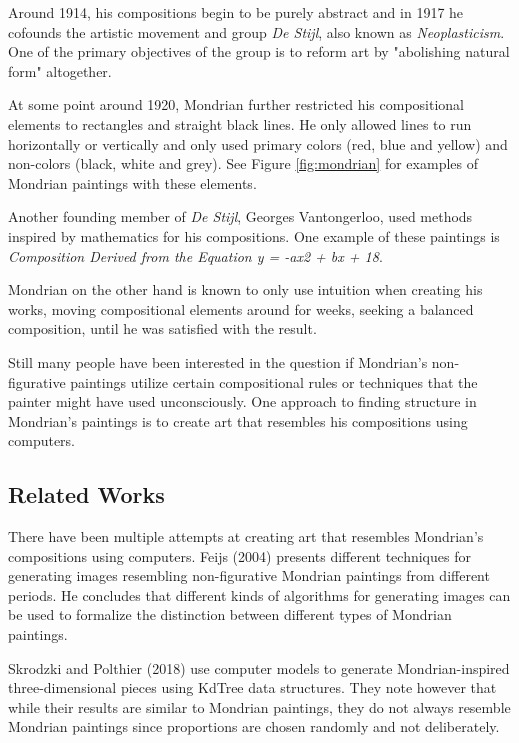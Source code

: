 \documentclass[serif,article,noparskip]{agse-thesis}
\begin{document}
Around 1914, his compositions begin to be purely abstract and in 1917 he cofounds
the artistic movement and group \textit{De Stijl}, also known as
\textit{Neoplasticism}. One of the primary objectives of the group is to reform
art by "abolishing natural form" \cite{wiki:manifest} altogether.

At some point around 1920, Mondrian further restricted his compositional
elements to rectangles and straight black lines. He only allowed lines to run
horizontally or vertically and only used primary colors (red, blue and yellow)
and non-colors (black, white and grey). See Figure \ref{fig:mondrian} for
examples of Mondrian paintings with these elements.

Another founding member of \textit{De Stijl}, Georges Vantongerloo, used methods
inspired by mathematics for his compositions. One example of these paintings is
\textit{Composition Derived from the Equation y = -ax2 + bx + 18}.

Mondrian on the other hand is known to only use intuition when creating his
works, moving compositional elements around for weeks, seeking a balanced
composition, until he was satisfied with the result.

Still many people have been interested in the question if Mondrian's
non-figurative paintings utilize certain compositional rules or techniques that
the painter might have used unconsciously. One approach to finding structure in
Mondrian's paintings is to create art that resembles his compositions
using computers.

\subsection{Related Works}

There have been multiple attempts at creating art that resembles Mondrian's
compositions using computers. Feijs (2004) \cite{Feijs2004} presents different
techniques for generating images resembling non-figurative Mondrian paintings
from different periods. He concludes that different kinds of algorithms for
generating images can be used to formalize the distinction between different
types of Mondrian paintings.

Skrodzki and Polthier (2018) \cite{Skrodzki2018} use computer models to generate
Mondrian-inspired three-dimensional pieces using KdTree data structures. They
note however that while their results are similar to Mondrian paintings, they do
not always resemble Mondrian paintings since proportions are chosen randomly and
not deliberately.
\end{document}
